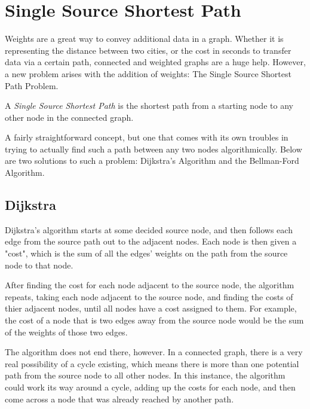 \chapter{Single Source Shortest Path}

Weights are a great way to convey additional data in a graph. Whether it is representing the distance between two cities, or the cost in seconds to transfer data via a certain path, connected and weighted graphs are a huge help.
However, a new problem arises with the addition of weights: The Single Source Shortest Path Problem.

\begin{definition}
A \emph{Single Source Shortest Path} is the shortest path from a starting node to any other node in the connected graph.
\end{definition}

A fairly straightforward concept, but one that comes with its own troubles in trying to actually find such a path between any two nodes algorithmically. Below are two solutions to such a problem: Dijkstra's Algorithm and the Bellman-Ford Algorithm.

\section{Dijkstra}
Dijkstra's algorithm starts at some decided source node, and then follows each edge from the source path out to the adjacent nodes. Each node is then given a "cost", which is the sum of all the edges' weights on the path from the source node to that node. 

After finding the cost for each node adjacent to the source node, the algorithm repeats, taking each node adjacent to the source node, and finding the costs of thier adjacent nodes, until all nodes have a cost assigned to them. For example, the cost of a node that is two edges away from the source node would be the sum of the weights of those two edges.

The algorithm does not end there, however. In a connected graph, there is a very real possibility of a cycle existing, which means there is more than one potential path from the source node to all other nodes. In this instance, the algorithm could work its way around a cycle, adding up the costs for each node, and then come across a node that was already reached by another path. 

